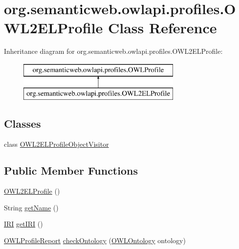 \hypertarget{classorg_1_1semanticweb_1_1owlapi_1_1profiles_1_1_o_w_l2_e_l_profile}{\section{org.\-semanticweb.\-owlapi.\-profiles.\-O\-W\-L2\-E\-L\-Profile Class Reference}
\label{classorg_1_1semanticweb_1_1owlapi_1_1profiles_1_1_o_w_l2_e_l_profile}
}
Inheritance diagram for org.\-semanticweb.\-owlapi.\-profiles.\-O\-W\-L2\-E\-L\-Profile\-:\begin{figure}[H]
\begin{center}
\leavevmode
\includegraphics[height=2.000000cm]{classorg_1_1semanticweb_1_1owlapi_1_1profiles_1_1_o_w_l2_e_l_profile}
\end{center}
\end{figure}
\subsection*{Classes}
\begin{DoxyCompactItemize}
\item 
class \hyperlink{classorg_1_1semanticweb_1_1owlapi_1_1profiles_1_1_o_w_l2_e_l_profile_1_1_o_w_l2_e_l_profile_object_visitor}{O\-W\-L2\-E\-L\-Profile\-Object\-Visitor}
\end{DoxyCompactItemize}
\subsection*{Public Member Functions}
\begin{DoxyCompactItemize}
\item 
\hyperlink{classorg_1_1semanticweb_1_1owlapi_1_1profiles_1_1_o_w_l2_e_l_profile_a969ac836a0f3c6d08a1c4105074046af}{O\-W\-L2\-E\-L\-Profile} ()
\item 
String \hyperlink{classorg_1_1semanticweb_1_1owlapi_1_1profiles_1_1_o_w_l2_e_l_profile_af991845f22189ea2dcd04d94af3bdf33}{get\-Name} ()
\item 
\hyperlink{classorg_1_1semanticweb_1_1owlapi_1_1model_1_1_i_r_i}{I\-R\-I} \hyperlink{classorg_1_1semanticweb_1_1owlapi_1_1profiles_1_1_o_w_l2_e_l_profile_abf78fa63468e836d0cb6c7a69262222c}{get\-I\-R\-I} ()
\item 
\hyperlink{classorg_1_1semanticweb_1_1owlapi_1_1profiles_1_1_o_w_l_profile_report}{O\-W\-L\-Profile\-Report} \hyperlink{classorg_1_1semanticweb_1_1owlapi_1_1profiles_1_1_o_w_l2_e_l_profile_a73faf559001ad31ea85047376856b03b}{check\-Ontology} (\hyperlink{interfaceorg_1_1semanticweb_1_1owlapi_1_1model_1_1_o_w_l_ontology}{O\-W\-L\-Ontology} ontology)
\end{DoxyCompactItemize}
